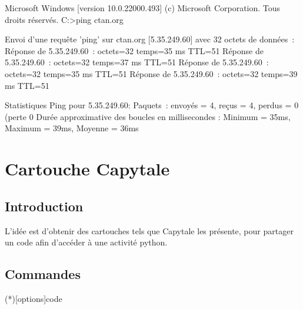 \documentclass{article}
\begin{document}
\begin{codesortie}
\begin{PLtermwin}[15cm]{}
Microsoft Windows [version 10.0.22000.493]
(c) Microsoft Corporation. Tous droits réservés.
C:\Users\test>ping ctan.org

Envoi d’une requête 'ping' sur ctan.org [5.35.249.60] avec 32 octets de données :
Réponse de 5.35.249.60 : octets=32 temps=35 ms TTL=51
Réponse de 5.35.249.60 : octets=32 temps=37 ms TTL=51
Réponse de 5.35.249.60 : octets=32 temps=35 ms TTL=51
Réponse de 5.35.249.60 : octets=32 temps=39 ms TTL=51

Statistiques Ping pour 5.35.249.60:
Paquets : envoyés = 4, reçus = 4, perdus = 0 (perte 0%
Durée approximative des boucles en millisecondes :
Minimum = 35ms, Maximum = 39ms, Moyenne = 36ms
\end{PLtermwin}


\end{codesortie}

\newpage

\section{Cartouche Capytale}\label{capytale}

\subsection{Introduction}

\begin{codeidee}
L'idée est d'obtenir des \textsf{cartouches} tels que \textsf{Capytale} les présente, pour partager un code afin d'accéder à une activité \textsf{python}.
\end{codeidee}

\subsection{Commandes}

\begin{codetex}
\liencapytale(*)[options]{code}
\end{codetex}
\end{document}
